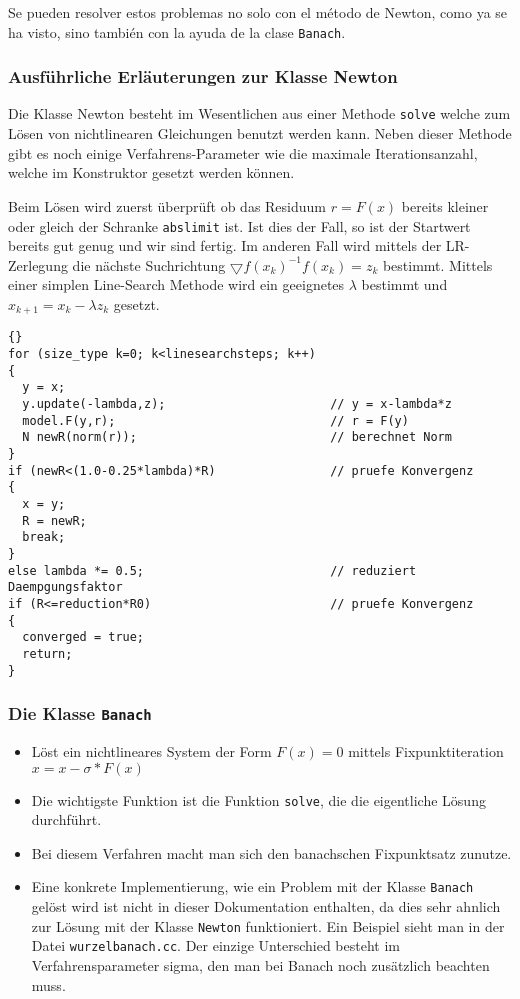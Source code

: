 \documentclass[a4paper,11pt]{article}
\theoremstyle{definition}
\begin{document}
Se pueden resolver estos problemas no solo con el método de Newton, como ya se ha visto, sino también con la ayuda de la clase \lstinline{Banach}.

\subsubsection{Ausführliche Erläuterungen zur Klasse Newton}

Die Klasse Newton besteht im Wesentlichen aus einer Methode
\lstinline{solve} welche zum Lösen von nichtlinearen Gleichungen
benutzt werden kann. Neben dieser Methode gibt es noch einige
Verfahrens-Parameter wie die maximale Iterationsanzahl, welche im
Konstruktor gesetzt werden können.

Beim Lösen wird zuerst überprüft ob das Residuum $r=F(x)$ bereits
kleiner oder gleich der Schranke \lstinline{abslimit} ist. Ist dies
der Fall, so ist der Startwert bereits gut genug und wir sind
fertig. Im anderen Fall wird mittels der LR-Zerlegung die nächste
Suchrichtung $\bigtriangledown f(x_k)^{-1}f(x_k) = z_k$
bestimmt. Mittels einer simplen Line-Search Methode wird ein
geeignetes $\lambda$ bestimmt und $x_{k+1}=x_k-\lambda z_k$ gesetzt.

{\footnotesize{\begin{lstlisting}{}
for (size_type k=0; k<linesearchsteps; k++)
{
  y = x;
  y.update(-lambda,z);                       // y = x-lambda*z
  model.F(y,r);                              // r = F(y)
  N newR(norm(r));                           // berechnet Norm
}
if (newR<(1.0-0.25*lambda)*R)                // pruefe Konvergenz
{
  x = y;
  R = newR;
  break;
}
else lambda *= 0.5;                          // reduziert Daempgungsfaktor
if (R<=reduction*R0)                         // pruefe Konvergenz
{
  converged = true;
  return;
}
\end{lstlisting}}}


\subsubsection{Die Klasse \lstinline{Banach}}
\begin{itemize}
\item Löst ein nichtlineares System der Form $F(x)=0$ mittels
  Fixpunktiteration $x = x - \sigma*F(x)$
\item Die wichtigste Funktion ist die Funktion \lstinline{solve}, die
  die eigentliche Lösung durchführt.
\item Bei diesem Verfahren macht man sich den banachschen Fixpunktsatz
  zunutze.
\item Eine konkrete Implementierung, wie ein Problem mit der Klasse
  \lstinline{Banach} gelöst wird ist nicht in dieser Dokumentation
  enthalten, da dies sehr ahnlich zur Lösung mit der Klasse
  \lstinline{Newton} funktioniert. Ein Beispiel sieht man in der Datei
  \lstinline{wurzelbanach.cc}. Der einzige Unterschied besteht im
  Verfahrensparameter sigma, den man bei Banach noch zusätzlich
  beachten muss.
\end{itemize}
\end{document}
